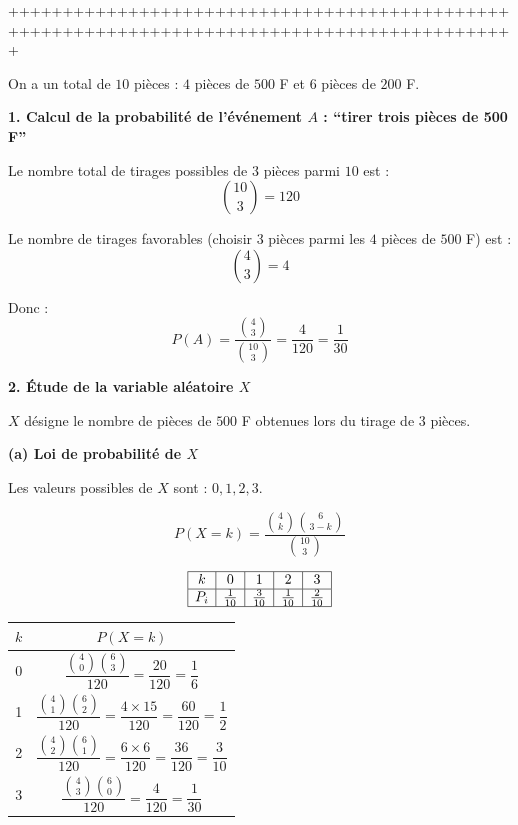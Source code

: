 \documentclass[12pt,a4paper]{article}
\begin{document}
+++++++++++++++++++++++++++++++++++++++++++++++++++++++++++++++++++++++++++++++++++++++++++++

\begin{correction}
On a un total de $10$ pièces : $4$ pièces de $500$ F et $6$ pièces de $200$ F.

\bigskip

\textbf{1. Calcul de la probabilité de l'événement $A$ : ``tirer trois pièces de 500 F''}

Le nombre total de tirages possibles de $3$ pièces parmi $10$ est :
\[
\binom{10}{3} = 120
\]

Le nombre de tirages favorables (choisir $3$ pièces parmi les $4$ pièces de $500$ F) est :
\[
\binom{4}{3} = 4
\]

Donc :
\[
P(A) = \frac{\binom{4}{3}}{\binom{10}{3}} = \frac{4}{120} = \frac{1}{30}
\]

\bigskip

\textbf{2. Étude de la variable aléatoire $X$}

$X$ désigne le nombre de pièces de $500$ F obtenues lors du tirage de $3$ pièces.

\medskip

\textbf{(a) Loi de probabilité de $X$}

Les valeurs possibles de $X$ sont : $0, 1, 2, 3$.

\[
P(X = k) = \frac{\binom{4}{k} \binom{6}{3-k}}{\binom{10}{3}}
\]

\[
\begin{array}{|c|c|c|c|c|}
\hline
k & 0 & 1 & 2 & 3 \\
\hline
P_i & \frac{1}{10} & \frac{3}{10} & \frac{1}{10} & \frac{2}{10} \\
\hline
\end{array}
\]
\begin{tabular}{|c|c|}
\hline
$k$ & $P(X = k)$ \\
\hline
0 & $\dfrac{\binom{4}{0}\binom{6}{3}}{120} = \dfrac{20}{120} = \dfrac{1}{6}$ \\
\hline
1 & $\dfrac{\binom{4}{1}\binom{6}{2}}{120} = \dfrac{4 \times 15}{120} = \dfrac{60}{120} = \dfrac{1}{2}$ \\
\hline
2 & $\dfrac{\binom{4}{2}\binom{6}{1}}{120} = \dfrac{6 \times 6}{120} = \dfrac{36}{120} = \dfrac{3}{10}$ \\
\hline
3 & $\dfrac{\binom{4}{3}\binom{6}{0}}{120} = \dfrac{4}{120} = \dfrac{1}{30}$ \\
\hline
\end{tabular}
\bigskip


\end{correction}
\end{document}
